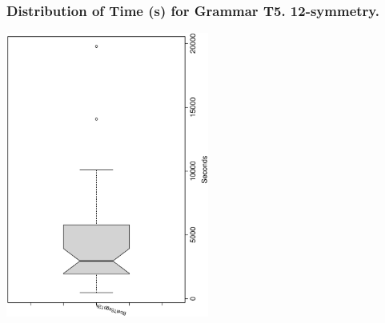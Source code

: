  \begin{frame}
 \frametitle{ Distribution of Time (s) for Grammar T5. 12-symmetry. }
 \begin{center}
\includegraphics[width=0.5\textwidth, angle=-90]
{ExpFboxplottSeconds010.eps}
 \end{center}
 \label{ExpFboxplottSeconds010.eps}  
 \end{frame}


